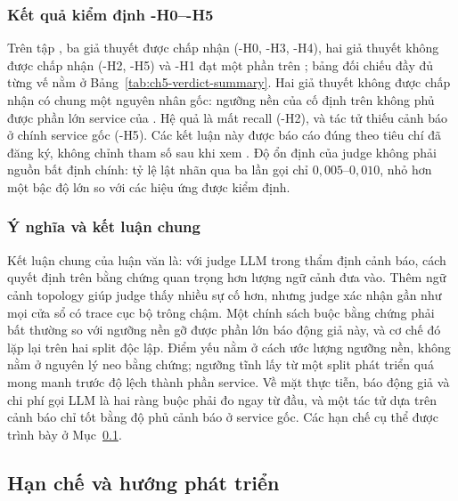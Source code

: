 \subsubsection{Kết quả kiểm định \hyp{H0}--\hyp{H5}}
\label{sec:ch8-h0-h5}

Trên tập , ba giả thuyết được chấp nhận (\hyp{H0}, \hyp{H3}, \hyp{H4}), hai giả thuyết không được chấp nhận (\hyp{H2}, \hyp{H5}) và \hyp{H1} đạt một phần trên ; bảng đối chiếu đầy đủ từng vế nằm ở Bảng~\ref{tab:ch5-verdict-summary}. Hai giả thuyết không được chấp nhận có chung một nguyên nhân gốc: ngưỡng nền của  cố định trên  không phủ được phần lớn service của . Hệ quả là \CTAV{} mất recall (\hyp{H2}), và tác tử  thiếu cảnh báo ở chính service gốc (\hyp{H5}). Các kết luận này được báo cáo đúng theo tiêu chí đã đăng ký, không chỉnh tham số sau khi xem . Độ ổn định của judge không phải nguồn bất định chính: tỷ lệ lật nhãn qua ba lần gọi chỉ $0{,}005$--$0{,}010$, nhỏ hơn một bậc độ lớn so với các hiệu ứng được kiểm định. %

\subsubsection{Ý nghĩa và kết luận chung}
\label{sec:ch8-ket-luan}

Kết luận chung của luận văn là: với judge LLM trong thẩm định cảnh báo, cách quyết định trên bằng chứng quan trọng hơn lượng ngữ cảnh đưa vào. Thêm ngữ cảnh topology giúp judge thấy nhiều sự cố hơn, nhưng judge xác nhận gần như mọi cửa sổ có trace cục bộ trông chậm. Một chính sách buộc bằng chứng phải bất thường so với ngưỡng nền gỡ được phần lớn báo động giả này, và cơ chế đó lặp lại trên hai split độc lập. Điểm yếu nằm ở cách ước lượng ngưỡng nền, không nằm ở nguyên lý neo bằng chứng; ngưỡng tĩnh lấy từ một split phát triển quá mong manh trước độ lệch thành phần service. Về mặt thực tiễn, báo động giả và chi phí gọi LLM là hai ràng buộc phải đo ngay từ đầu, và một tác tử  dựa trên cảnh báo chỉ tốt bằng độ phủ cảnh báo ở service gốc. Các hạn chế cụ thể được trình bày ở Mục~\ref{sec:ch8-han-che}.

\subsection{Hạn chế và hướng phát triển}
\label{sec:ch8-han-che}

